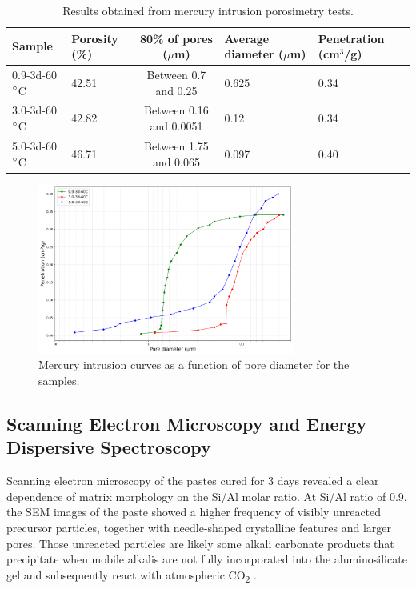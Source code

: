 \begin{table}[H]
  \centering
  \caption{Results obtained from mercury intrusion porosimetry tests. \label{tab:mip}}
  \begin{tabular}{l p{1.5cm} c p{2.25cm} p{2cm}}
    \hline
    Sample & Porosity (\%) & 80\% of pores ($\mu$m) & Average diameter ($\mu$m) & Penetration (cm$^3$/g) \\ 
    \hline
    0.9-3d-60$^{\circ}$C & 42.51 & Between 0.7 and 0.25 & 0.625 & 0.34 \\
    3.0-3d-60$^{\circ}$C & 42.82 & Between 0.16 and 0.0051 & 0.12 & 0.34 \\
    5.0-3d-60$^{\circ}$C & 46.71 & Between 1.75 and 0.065 & 0.097 & 0.40 \\
    \hline
  \end{tabular}
\end{table}

\begin{figure}[H]
  \centering
  \includegraphics[width=0.75\textwidth]{Cap4/images/mip_inverted.png}
  \caption{Mercury intrusion curves as a function of pore diameter for the samples.}
  \label{fig:mip}
\end{figure}

\subsection{Scanning Electron Microscopy and Energy Dispersive Spectroscopy}

Scanning electron microscopy of the pastes cured for 3 days revealed a clear dependence of matrix morphology on the Si/Al molar ratio.
At Si/Al ratio of 0.9, the SEM images of the paste showed a higher frequency of visibly unreacted precursor particles, together with needle-shaped crystalline features and larger pores. Those unreacted particles are likely some alkali carbonate products that precipitate when mobile alkalis are not fully incorporated into the aluminosilicate gel and subsequently react with atmospheric CO\textsubscript{2} \cite{provis2018alkali}.

